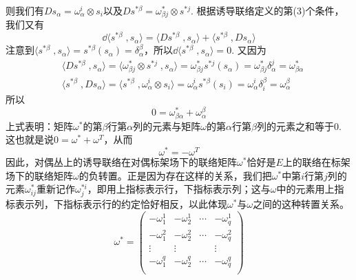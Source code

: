 则我们有$Ds_{\alpha}=\omega_{\alpha}^{i }\otimes s_{i}$以及$Ds^{\ast \beta }=\omega^{\ast}_{\beta j}\otimes s^{\ast j}$. 根据诱导联络定义的第(3)个条件，我们又有
\[
\dd \langle s^{\ast\beta}\;,s_{\alpha} \rangle=\langle Ds^{\ast\beta}\;,s_{\alpha} \rangle+\langle s^{\ast\beta} \;,Ds_{\alpha} \rangle
\]
注意到$\langle s^{\ast\beta}\;,s_{\alpha} \rangle=s^{\ast \beta }(s_{\alpha})=\delta_{\alpha}^{\beta}$，所以$\dd \langle s^{\ast\beta}\;,s_{\alpha} \rangle=0$. 又因为
\[
\begin{split}
&\langle Ds^{\ast\beta}\;,s_{\alpha} \rangle=\langle \omega^{\ast}_{\beta j}\otimes s^{\ast j}\;,s_{\alpha} \rangle=\omega^{\ast}_{\beta j} s^{\ast j}(s_{\alpha})=\omega^{\ast}_{\beta j}\delta^{j}_{\alpha}=\omega^{\ast}_{\beta \alpha}\\
&\langle s^{\ast\beta} \;,Ds_{\alpha} \rangle=\langle s^{\ast\beta} \;,\omega_{\alpha}^{i }\otimes s_{i} \rangle=\omega_{\alpha}^{i } s^{\ast\beta}(s_{i})=\omega_{\alpha}^{i }\delta^{\beta}_{i}=\omega_{\alpha}^{\beta }
\end{split}
\]
所以
\[
0=\omega^{\ast}_{\beta \alpha}+\omega_{\alpha}^{\beta }
\]
上式表明：矩阵$\omega^{\ast}$的第$\beta$行第$\alpha$列的元素与矩阵$\omega$的第$\alpha$行第$\beta$列的元素之和等于0. 这也就是说$0=\omega^{\ast}+\omega^{T}$，从而
\[
\omega^{\ast}=-\omega^{T}
\]
因此，对偶丛上的诱导联络在对偶标架场下的联络矩阵$\omega^{\ast}$恰好是$E$上的联络在标架场下的联络矩阵$\omega$的负转置。正是因为存在这样的关系，我们把$\omega^{\ast}$中第$i$行第$j$列的元素$\omega^{\ast}_{ij}$重新记作$\omega^{\ast i}_{j}$，即用上指标表示行，下指标表示列；这与$\omega$中的元素用上指标表示列，下指标表示行的约定恰好相反，以此体现$\omega^{\ast}$与$\omega$之间的这种转置关系。
\[
\omega^{\ast}=\left( \begin{array}{cccc}{-\omega^{1}_{1}} & {-\omega^{1}_{2}}&{\cdots}&{-\omega^{1}_{q}}\\ {-\omega^{2}_{1}} & {-\omega^{2}_{2}}&{\cdots}&{-\omega^{2}_{q}}\\ {\vdots} & {\vdots}&{ }&{\vdots}\\{-\omega^{q}_{1}} & {-\omega^{q}_{2}}&{\cdots}&{-\omega^{q}_{q}}\\ \end{array}\right)
\]

